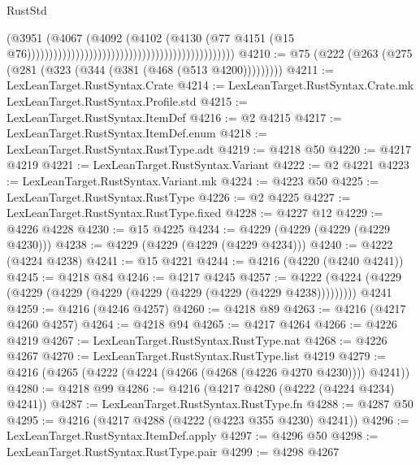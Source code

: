 \begin{lexlean}{RustStd}
\begin{coremodule}
{\begin{coremodule}
{{{{{{{{{{{{{{{{{{{{{{{{{{{{{{{{{{{{{{{{{{{{{{{{{{{{{{{{{{{{                                                                                    (@3951
                                                                                      (@4067
                                                                                        (@4092
                                                                                          (@4102
                                                                                            (@4130
                                                                                              (@77
                                                                                                @4151
                                                                                                (@15
                                                                                                  @76)))))))))))))))))))))))))))))))))))))))))))))))
@4210 := @75 (@222 (@263 (@275 (@281 (@323 (@344 (@381 (@468 (@513 @4200)))))))))
@4211 := LexLeanTarget.RustSyntax.Crate
@4214 := LexLeanTarget.RustSyntax.Crate.mk LexLeanTarget.RustSyntax.Profile.std
@4215 := LexLeanTarget.RustSyntax.ItemDef
@4216 := @2 @4215
@4217 := LexLeanTarget.RustSyntax.ItemDef.enum
@4218 := LexLeanTarget.RustSyntax.RustType.adt
@4219 := @4218 @50
@4220 := @4217 @4219
@4221 := LexLeanTarget.RustSyntax.Variant
@4222 := @2 @4221
@4223 := LexLeanTarget.RustSyntax.Variant.mk
@4224 := @4223 @50
@4225 := LexLeanTarget.RustSyntax.RustType
@4226 := @2 @4225
@4227 := LexLeanTarget.RustSyntax.RustType.fixed
@4228 := @4227 @12
@4229 := @4226 @4228
@4230 := @15 @4225
@4234 := @4229 (@4229 (@4229 (@4229 @4230)))
@4238 := @4229 (@4229 (@4229 (@4229 @4234)))
@4240 := @4222 (@4224 @4238)
@4241 := @15 @4221
@4244 := @4216 (@4220 (@4240 @4241))
@4245 := @4218 @84
@4246 := @4217 @4245
@4257 := @4222 (@4224 (@4229 (@4229 (@4229 (@4229 (@4229 (@4229 (@4229 (@4229 @4238))))))))) @4241
@4259 := @4216 (@4246 @4257)
@4260 := @4218 @89
@4263 := @4216 (@4217 @4260 @4257)
@4264 := @4218 @94
@4265 := @4217 @4264
@4266 := @4226 @4219
@4267 := LexLeanTarget.RustSyntax.RustType.nat
@4268 := @4226 @4267
@4270 := LexLeanTarget.RustSyntax.RustType.list @4219
@4279 := @4216 (@4265 (@4222 (@4224 (@4266 (@4268 (@4226 @4270 @4230)))) @4241))
@4280 := @4218 @99
@4286 := @4216 (@4217 @4280 (@4222 (@4224 @4234) @4241))
@4287 := LexLeanTarget.RustSyntax.RustType.fn
@4288 := @4287 @50
@4295 := @4216 (@4217 @4288 (@4222 (@4223 @355 @4230) @4241))
@4296 := LexLeanTarget.RustSyntax.ItemDef.apply
@4297 := @4296 @50
@4298 := LexLeanTarget.RustSyntax.RustType.pair
@4299 := @4298 @4267
}}}}}}}}}}}}}}}}}}}}}}}}}}}}}}}}}}}}}}}}}}}}}}}}}}}}}}}}}}}}
\end{coremodule}}
\end{coremodule}
\end{lexlean}
